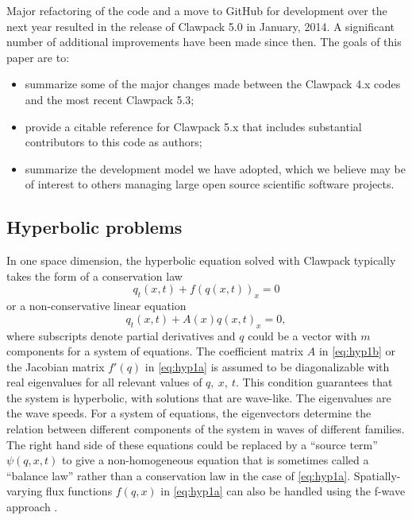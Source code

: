 Major refactoring of the code and a move to GitHub for development over the
next year resulted in the release of Clawpack 5.0 in January, 2014. 
A significant number of additional improvements have been made since then. 
The goals of this paper are to:

\begin{itemize} 
\item summarize some of the major changes made between the Clawpack
4.x codes and the most recent Clawpack 5.3;  
\item provide a citable reference for Clawpack 5.x that includes
substantial contributors to this code as authors;
\item summarize the development model we have adopted, which we believe
may be of interest to others managing large open source scientific software
projects.
\end{itemize} 


\subsection{Hyperbolic problems}\label{sec:hyp}

In one space dimension, the hyperbolic equation solved with
Clawpack typically takes the form of a conservation law
\begin{equation}\label{eq:hyp1a}
q_t(x,t) + f(q(x,t))_x = 0
\end{equation}
or a non-conservative linear equation
\begin{equation}\label{eq:hyp1b}
q_t(x,t) + A(x)q(x,t)_x = 0,
\end{equation} 
where subscripts denote partial derivatives and
$q$ could be a vector with $m$ components for a system of equations. 
The coefficient matrix $A$ in \cref{eq:hyp1b} or the Jacobian matrix 
$f'(q)$ in \ref{eq:hyp1a} is assumed to be diagonalizable with real eigenvalues
for all relevant values of $q,~x,~t$. 
This condition
guarantees that the system is hyperbolic, with solutions that are wave-like.  
The eigenvalues are the wave speeds.  For a system of equations,
the eigenvectors determine the relation between different components of the
system in waves of different families.  The right hand side of these
equations could be replaced by a ``source term'' $\psi(q,x,t)$ to give a
non-homogeneous equation that is sometimes called a ``balance law'' rather
than a conservation law in the case of \cref{eq:hyp1a}.
Spatially-varying flux functions $f(q,x)$ in \cref{eq:hyp1a} can also be handled
using the f-wave approach \cite{db-rjl-sm-jr:vcflux}.

